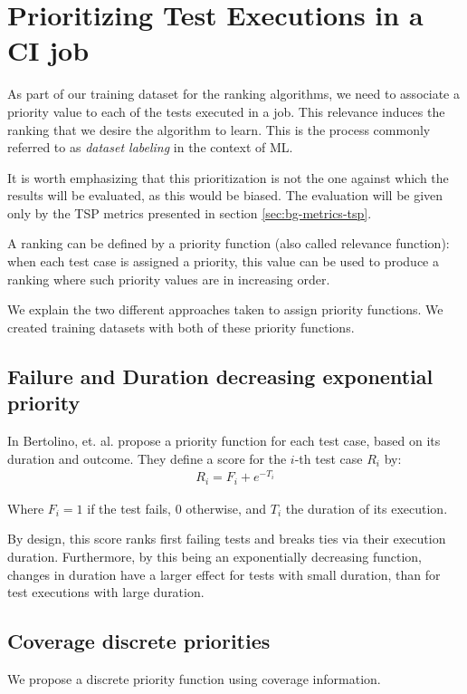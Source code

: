 \section{Prioritizing Test Executions in a CI job}\label{s:method-prioritizing-testruns}

As part of our training dataset for the ranking algorithms, we need to associate a priority value
to each of the tests executed in a job. This relevance induces the ranking that we desire the algorithm to 
learn. This is the process commonly referred to as \emph{dataset labeling} in the context of ML.

It is worth emphasizing that this prioritization is not the one against which the results
will be evaluated, as this would be biased. The evaluation will be given only by the 
TSP metrics presented in section \ref{sec:bg-metrics-tsp}.

A ranking can be defined by a priority function (also called relevance function): when each 
test case is assigned a priority, this value can be used to produce a ranking where such 
priority values are in increasing order.

We explain the two different approaches taken to assign priority functions. We created training datasets with both of these priority functions.

\subsection{Failure and Duration decreasing exponential priority}

In \cite{Bertolino2020LearningtoRankVR} Bertolino, et. al. propose a priority function for each test case, based on its duration and outcome.
They define a score for the $i$-th test case $R_i$ by:
\begin{align*}
R_i = F_i + e^{-T_i}
\end{align*}

Where $F_i = 1$ if the test fails, $0$ otherwise, and $T_i$ the duration of its execution.

By design, this score ranks first failing tests and breaks ties via their execution duration.
Furthermore, by this being an exponentially decreasing function, changes
in duration have a larger effect for tests with small duration, than for test executions with
large duration.

\subsection{Coverage discrete priorities}\label{s:method-prioritizingtestcases}
We propose a discrete priority function using coverage information. 

